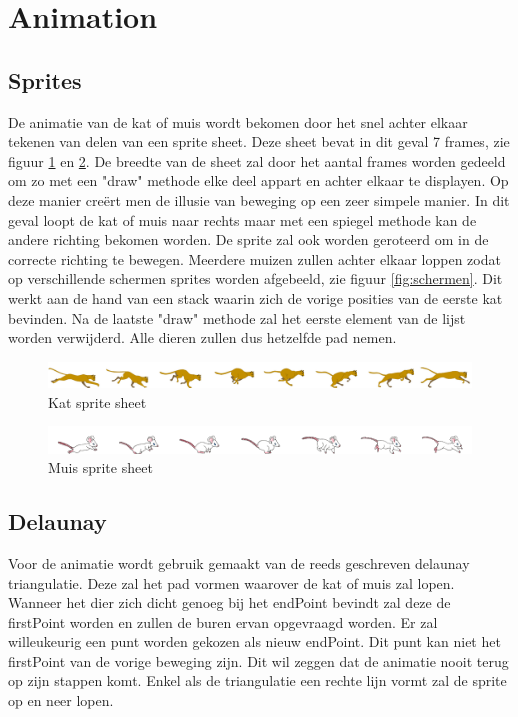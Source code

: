 \section{Animation}


\subsection{Sprites}

De animatie van de kat of muis wordt bekomen door het snel achter elkaar tekenen van delen van een sprite sheet. Deze sheet bevat in dit geval 7 frames, zie figuur \ref{fig:cat} en \ref{fig:mouse}. De breedte van de sheet zal door het aantal frames worden gedeeld om zo met een "draw" methode elke deel appart en achter elkaar te displayen. Op deze manier creërt men de illusie van beweging op een zeer simpele manier. In dit geval loopt de kat of muis naar rechts maar met een spiegel methode kan de andere richting bekomen worden. De sprite zal ook worden geroteerd om in de correcte richting te bewegen. Meerdere muizen zullen achter elkaar loppen zodat op verschillende schermen sprites worden afgebeeld, zie figuur \ref{fig:schermen}. Dit werkt aan de hand van een stack waarin zich de vorige posities van de eerste kat bevinden. Na de laatste "draw" methode zal het eerste element van de lijst worden verwijderd. Alle dieren zullen dus hetzelfde pad nemen.

\begin{figure}[H]
\centering
\includegraphics[scale=0.2]{img/cat2.png}
\caption{Kat sprite sheet \cite{catsprite}}
\label{fig:cat}
\end{figure}

\begin{figure}[H]
\centering
\includegraphics[scale=0.8]{img/mouse2_trans.png}
\caption{Muis sprite sheet \cite{mousesprite}}
\label{fig:mouse}
\end{figure}


\newpage
\subsection{Delaunay}

Voor de animatie wordt gebruik gemaakt van de reeds geschreven delaunay triangulatie. Deze zal het pad vormen waarover de kat of muis zal lopen. Wanneer het dier zich dicht genoeg bij het endPoint bevindt zal deze de firstPoint worden en zullen de buren ervan opgevraagd worden. Er zal willeukeurig een punt worden gekozen als nieuw endPoint. Dit punt kan niet het firstPoint van de vorige beweging zijn. Dit wil zeggen dat de animatie nooit terug op zijn stappen komt. Enkel als de triangulatie een rechte lijn vormt zal de sprite op en neer lopen. 

